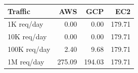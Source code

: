 \begin{tabular}{lrrr}
\toprule
Traffic & AWS & GCP & EC2 \\
\midrule
1K req/day & 0.00 & 0.00 & 179.71 \\
10K req/day & 0.00 & 0.00 & 179.71 \\
100K req/day & 2.40 & 9.68 & 179.71 \\
1M req/day & 275.09 & 194.03 & 179.71 \\
\bottomrule
\end{tabular}
